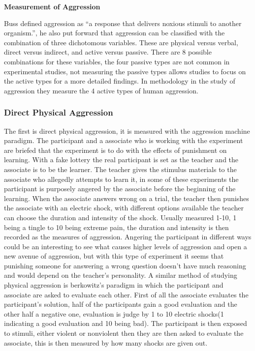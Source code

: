 \documentclass[journal]{IEEEtran}
\begin{document}
        \textbf{Measurement of Aggression}
        
                Buss defined aggression as “a response that delivers noxious stimuli to another organism.”\cite{Buss}, he also put forward that aggression can be classified with the combination of three dichotomous variables. These are physical versus verbal, direct versus indirect, and active versus passive. There are 8 possible combinations for these variables, the four passive types are not common in experimental studies\cite{Bushman}, not measuring the passive types allows studies to focus on the active types for a more detailed findings. In methodology in the study of aggression they measure the 4 active types of human aggression. 

    \subsubsection{Direct Physical Aggression}
        The first is direct physical aggression, it is measured with the aggression machine paradigm\cite{Buss}. The participant and a associate who is working with the experiment are briefed that the experiment is to do with the effects of punishment on learning. With a fake lottery the real participant is set as the teacher and the associate is to be the learner. The teacher gives the stimulus materials to the associate who allegedly attempts to learn it, in some of these experiments the participant is purposely angered by the associate before the beginning of the learning. When the associate answers wrong on a trial, the teacher then punishes the associate with an electric shock, with different options available the teacher can choose the duration and intensity of the shock. Usually measured 1-10, 1 being a tingle to 10 being extreme pain, the duration and intensity is then recorded as the measures of aggression. Angering the participant in different ways could be an interesting to see what causes higher levels of aggression and open a new avenue of aggression, but with this type of experiment it seems that punishing someone for answering a wrong question doesn't have much reasoning and would depend on the teacher's personality.
        A similar method of studying physical aggression is berkowitz’s paradigm in which the participant and associate are asked to evaluate each other\cite{Berkowitz}. First of all the associate evaluates the participant's solution, half of the participants gain a good evaluation and the other half a negative one, evaluation is judge by 1 to 10 electric shocks(1 indicating a good evaluation and 10 being bad). The participant is then exposed to stimuli, either violent or nonviolent then they are then asked to evaluate the associate, this is then measured by how many shocks are given out. 
\end{document}
